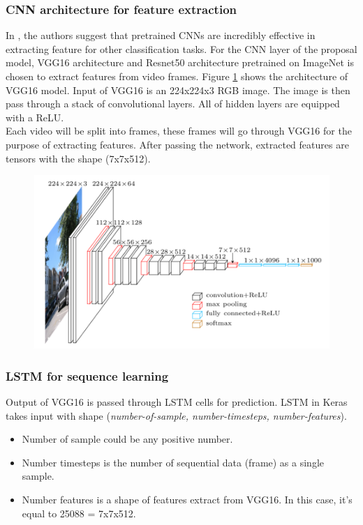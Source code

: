 \subsubsection{CNN architecture for feature extraction}
In \cite{DBLP:journals/corr/ZhouKLOT14}, the authors suggest that pretrained CNNs are incredibly effective in extracting feature for other classification tasks.
For the CNN layer of the proposal model, VGG16 \cite{DBLP:journals/corr/SimonyanZ14a} architecture and Resnet50 architecture pretrained on ImageNet  is chosen to extract features from video frames. Figure \ref{chap3:vgg16_architecture} shows the architecture of VGG16 model. Input of VGG16 is an 224x224x3 RGB image. The image is then pass through a stack of convolutional layers. All of hidden layers are equipped with a ReLU.\\
Each video will be split into frames, these frames will go through VGG16 for the purpose of extracting features. After passing the network, extracted features are tensors with the shape (7x7x512).
\begin{center}
    \begin{figure}[H]
    \centering
    \includegraphics[width=1\columnwidth]{images/chap3/vgg16_architecture.png}
    \label{chap3:vgg16_architecture}
    \end{figure}
\end{center}
\vspace{-1cm}
\subsubsection{LSTM for sequence learning}
Output of VGG16 is passed through LSTM cells for prediction.
LSTM in Keras takes input with shape (\textit{number-of-sample, number-timesteps, number-features}).
\begin{itemize}
	\item Number of sample could be any positive number.
	\item Number timesteps is the number of sequential data (frame) as a single sample.
	\item Number features is a shape of features extract from VGG16. In this case, it's equal to 25088 = 7x7x512.
\end{itemize}

